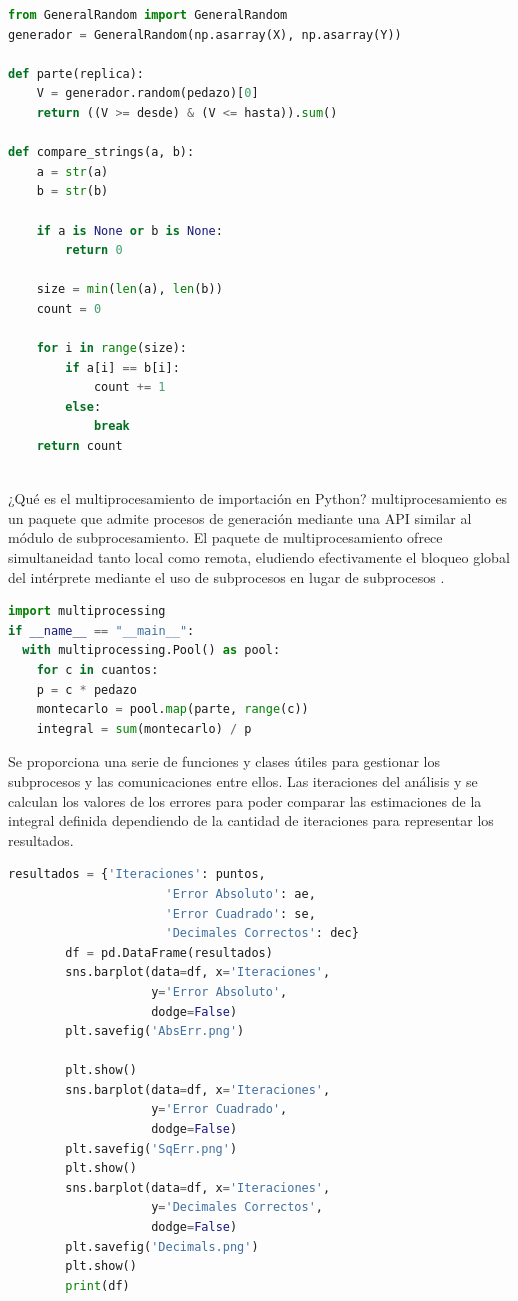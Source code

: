 \documentclass{article}
\begin{document}
\begin{lstlisting}[caption= Instrucciones para Generador Random, label=codigo3, language=Python]
from GeneralRandom import GeneralRandom
generador = GeneralRandom(np.asarray(X), np.asarray(Y))

def parte(replica):
    V = generador.random(pedazo)[0]
    return ((V >= desde) & (V <= hasta)).sum()

def compare_strings(a, b):
    a = str(a)
    b = str(b)
    
    if a is None or b is None:
        return 0
    
    size = min(len(a), len(b))
    count = 0

    for i in range(size):
        if a[i] == b[i]:
            count += 1
        else:
            break
    return count
 
\end{lstlisting}


¿Qué es el multiprocesamiento de importación en Python?
multiprocesamiento es un paquete que admite procesos de generación mediante una API similar al módulo de subprocesamiento. El paquete de multiprocesamiento ofrece simultaneidad tanto local como remota, eludiendo efectivamente el bloqueo global del intérprete mediante el uso de subprocesos en lugar de subprocesos \cite{Matpltlib} .

\begin{lstlisting}[caption= Instrucción para calcular iteraciones, label=codigo4, language=Python]
import multiprocessing
if __name__ == "__main__":
  with multiprocessing.Pool() as pool:
    for c in cuantos:
    p = c * pedazo
    montecarlo = pool.map(parte, range(c))
    integral = sum(montecarlo) / p
\end{lstlisting}

Se proporciona una serie de funciones y clases útiles para gestionar los subprocesos y las comunicaciones entre ellos. Las iteraciones del análisis y se calculan los valores de los errores para poder comparar las estimaciones de la integral definida dependiendo de la cantidad de iteraciones para representar los resultados. 

\begin{lstlisting}[caption= Resultados de iteraciones, label=codigo4, language=Python]
resultados = {'Iteraciones': puntos,
                      'Error Absoluto': ae,
                      'Error Cuadrado': se,
                      'Decimales Correctos': dec}
        df = pd.DataFrame(resultados)
        sns.barplot(data=df, x='Iteraciones',
                    y='Error Absoluto',
                    dodge=False)
        plt.savefig('AbsErr.png')

        plt.show()
        sns.barplot(data=df, x='Iteraciones',
                    y='Error Cuadrado',
                    dodge=False)
        plt.savefig('SqErr.png')
        plt.show()
        sns.barplot(data=df, x='Iteraciones',
                    y='Decimales Correctos',
                    dodge=False)
        plt.savefig('Decimals.png')
        plt.show()
        print(df)
\end{lstlisting}
\end{document}
